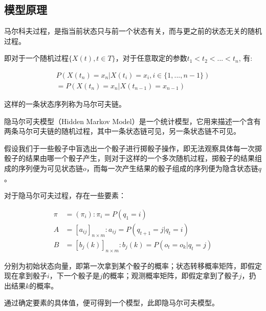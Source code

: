 \documentclass[hyperref]{ctexart}
\begin{document}
\begin{multicols}{2}
	\subsection{模型原理}
	马尔科夫过程，是指当前状态只与前一个状态有关，而与更之前的状态无关的随机过程。\par
    即对于一个随机过程$\{X(t), t\in T\}$，对于任意取定的参数$t_1 < t_2 < ... < t_n$,
    \noindent 有: \par
	\begin{equation*}
	\begin{aligned}
	    P(X(t_n) = x_n | X(t_i) = x_i, i \in \{1,...,n - 1\})\\ = 
		P(X(t_n) = x_n | X(t_{n-1}) = x_{n - 1})
	\end{aligned}
	\end{equation*}\par
	\indent\par 这样的一条状态序列称为马尔可夫链。\par
	隐马尔可夫模型（Hidden Markov Model）是一个统计模型，它用来描述一个含有两条马尔可夫链的随机过程，其中一条状态链可见，另一条状态链不可见。\par
    假设我们于一些骰子中盲选出一个骰子进行掷骰子操作，即无法观察具体每一次掷骰子的结果由哪一个骰子产生，则对于这样的一个多次随机过程，掷骰子的结果组成的序列便为可见状态链$o$，而每一次产生结果的骰子组成的序列便为隐含状态链$q$。\par
    对于隐马尔可夫过程，存在一些要素：\par \indent\par
    \noindent
    \begin{equation*}
    \begin{aligned}
        \pi &= (\pi_i):\pi_i = P(q_1 = i)\\
        A &= [a_{ij}]_{n \times m} :a_{ij} = P(q_{t+1} = j|q_t = i)\\
        B &= [b_j(k)]_{n \times m}: b_j(k) = P(o_t = o_k|q_t = j)
    \end{aligned}
    \end{equation*}\par \indent\par
    分别为初始状态向量，即第一次拿到某个骰子的概率；状态转移概率矩阵，即假定现在拿到骰子$i$，下一个骰子是$j$的概率；观测概率矩阵，即假定拿到了骰子$j$，扔出结果$k$的概率。\par
    通过确定要素的具体值，便可得到一个模型，此即隐马尔可夫模型。

\end{multicols}
\end{document}
